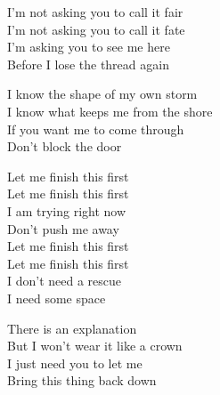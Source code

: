 \begin{lyrics}
I'm not asking you to call it fair\\
I'm not asking you to call it fate\\
I'm asking you to see me here\\
Before I lose the thread again

I know the shape of my own storm\\
I know what keeps me from the shore\\
If you want me to come through\\
Don't block the door

Let me finish this first\\
Let me finish this first\\
I am trying right now\\
Don't push me away\\
Let me finish this first\\
Let me finish this first\\
I don't need a rescue\\
I need some space

There is an explanation\\
But I won't wear it like a crown\\
I just need you to let me\\
Bring this thing back down
\end{lyrics}

